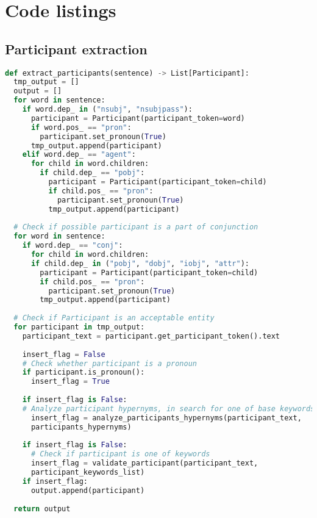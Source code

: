\chapter{Code listings}
\label{cha:listings}
\section{Participant extraction}
\begin{lstlisting}[language=Python, caption={Participant extraction function listing}, label={lst:participant_extraction}]
def extract_participants(sentence) -> List[Participant]:
  tmp_output = []
  output = []
  for word in sentence:
    if word.dep_ in ("nsubj", "nsubjpass"):
      participant = Participant(participant_token=word)
      if word.pos_ == "pron":
        participant.set_pronoun(True)
      tmp_output.append(participant)
    elif word.dep_ == "agent":
      for child in word.children:
        if child.dep_ == "pobj":
          participant = Participant(participant_token=child)
          if child.pos_ == "pron":
            participant.set_pronoun(True)
          tmp_output.append(participant)
  
  # Check if possible participant is a part of conjunction
  for word in sentence:
    if word.dep_ == "conj":
      for child in word.children:
      if child.dep_ in ("pobj", "dobj", "iobj", "attr"):
        participant = Participant(participant_token=child)
        if child.pos_ == "pron":
          participant.set_pronoun(True)
        tmp_output.append(participant)
  
  # Check if Participant is an acceptable entity
  for participant in tmp_output:
    participant_text = participant.get_participant_token().text
    
    insert_flag = False
    # Check whether participant is a pronoun
    if participant.is_pronoun():
      insert_flag = True
    
    if insert_flag is False:
    # Analyze participant hypernyms, in search for one of base keywords
      insert_flag = analyze_participants_hypernyms(participant_text,
      participants_hypernyms)
    
    if insert_flag is False:
      # Check if participant is one of keywords
      insert_flag = validate_participant(participant_text,
      participant_keywords_list)
    if insert_flag:
      output.append(participant)
  
  return output
\end{lstlisting}

